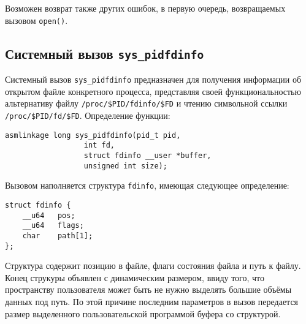 Возможен возврат также других ошибок, в первую очередь, возвращаемых вызовом
\texttt{open()}.

\subsection{Системный вызов \texttt{sys\_pidfdinfo}}

Системный вызов \texttt{sys\_pidfdinfo} предназначен для получения информации об
открытом файле конкретного процесса, представляя своей функциональностью
альтернативу файлу \texttt{/proc/\$PID/fdinfo/\$FD} и чтению символьной ссылки 
\texttt{/proc/\$PID/fd/\$FD}. Определение функции:

\medskip
\begin{lstlisting}[style=cstyle]
asmlinkage long sys_pidfdinfo(pid_t pid,
			      int fd,
			      struct fdinfo __user *buffer,
			      unsigned int size);
\end{lstlisting}
\medskip

Вызовом наполняется структура \texttt{fdinfo}, имеющая следующее определение:

\medskip
\begin{lstlisting}[style=cstyle]
struct fdinfo {
	__u64	pos;
	__u64	flags;
	char	path[1];
};
\end{lstlisting}
\medskip

Структура содержит позицию в файле, флаги состояния файла и путь к файлу. Конец
струкуры объявлен с динамическим размером, ввиду того, что пространству
пользователя может быть не нужно выделять большие объёмы данных под путь. По
этой причине последним параметров в вызов передается размер выделенного
пользовательской программой буфера со структурой.

